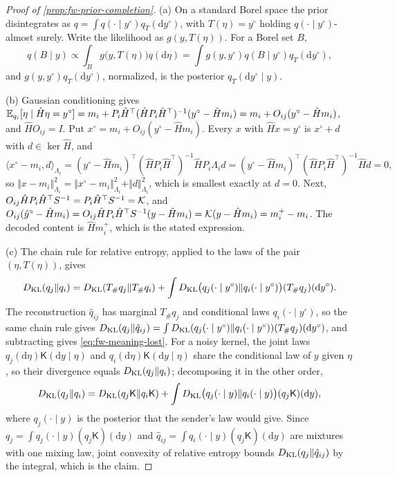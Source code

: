 \begin{proof}[Proof of \cref{prop:fw-prior-completion}]
(a) On a standard Borel space the prior disintegrates as $q=\int q(\cdot\mid y^\circ)q_T(\mathrm dy^\circ)$, with $T(\eta)=y^\circ$ holding $q(\cdot\mid y^\circ)$-almost surely. Write the likelihood as $g(y,T(\eta))$. For a Borel set $B$,
\[
q(B\mid y)\propto\int_Bg\bigl(y,T(\eta)\bigr)q(\mathrm d\eta)=\int g(y,y^\circ)q(B\mid y^\circ)q_T(\mathrm dy^\circ),
\]
and $g(y,y^\circ)q_T(\mathrm dy^\circ)$, normalized, is the posterior $q_T(\mathrm dy^\circ\mid y)$.

(b) Gaussian conditioning gives $\mathbb{E}_{q_i}[\eta\mid\hat H\eta=y^\circ]=m_i+P_i\hat H^\top(\hat HP_i\hat H^\top)^{-1}(y^\circ-\hat Hm_i)=m_i+O_{ij}(y^\circ-\hat Hm_i)$, and $\hat HO_{ij}=I$. Put $x^\circ=m_i+O_{ij}(y^\circ-\hat Hm_i)$. Every $x$ with $\hat Hx=y^\circ$ is $x^\circ+d$ with $d\in\ker\hat H$, and
\[
\langle x^\circ-m_i,d\rangle_{\Lambda_i}=(y^\circ-\hat Hm_i)^\top(\hat HP_i\hat H^\top)^{-1}\hat HP_i\Lambda_id=(y^\circ-\hat Hm_i)^\top(\hat HP_i\hat H^\top)^{-1}\hat Hd=0,
\]
so $\Vert x-m_i\Vert^2_{\Lambda_i}=\Vert x^\circ-m_i\Vert^2_{\Lambda_i}+\Vert d\Vert^2_{\Lambda_i}$, which is smallest exactly at $d=0$. Next, $O_{ij}\hat HP_i\hat H^\top S^{-1}=P_i\hat H^\top S^{-1}=\mathcal{K}$, and $O_{ij}(\hat y^\circ-\hat Hm_i)=O_{ij}\hat HP_i\hat H^\top S^{-1}(y-\hat Hm_i)=\mathcal{K}(y-\hat Hm_i)=m_i^+-m_i$. The decoded content is $\hat Hm_i^+$, which is the stated expression.

(c) The chain rule for relative entropy, applied to the laws of the pair $(\eta,T(\eta))$, gives
\[
D_{\mathrm{KL}}(q_j\Vert q_i)=D_{\mathrm{KL}}(T_\#q_j\Vert T_\#q_i)+\int D_{\mathrm{KL}}\bigl(q_j(\cdot\mid y^\circ)\Vert q_i(\cdot\mid y^\circ)\bigr)(T_\#q_j)(\mathrm dy^\circ).
\]
The reconstruction $\hat q_{ij}$ has marginal $T_\#q_j$ and conditional laws $q_i(\cdot\mid y^\circ)$, so the same chain rule gives $D_{\mathrm{KL}}(q_j\Vert\hat q_{ij})=\int D_{\mathrm{KL}}(q_j(\cdot\mid y^\circ)\Vert q_i(\cdot\mid y^\circ))(T_\#q_j)(\mathrm dy^\circ)$, and subtracting gives \eqref{eq:fw-meaning-lost}. For a noisy kernel, the joint laws $q_j(\mathrm d\eta)\mathsf K(\mathrm dy\mid\eta)$ and $q_i(\mathrm d\eta)\mathsf K(\mathrm dy\mid\eta)$ share the conditional law of $y$ given $\eta$, so their divergence equals $D_{\mathrm{KL}}(q_j\Vert q_i)$; decomposing it in the other order,
\[
D_{\mathrm{KL}}(q_j\Vert q_i)=D_{\mathrm{KL}}(q_j\mathsf K\Vert q_i\mathsf K)+\int D_{\mathrm{KL}}\bigl(q_j(\cdot\mid y)\Vert q_i(\cdot\mid y)\bigr)(q_j\mathsf K)(\mathrm dy),
\]
where $q_j(\cdot\mid y)$ is the posterior that the sender's law would give. Since $q_j=\int q_j(\cdot\mid y)(q_j\mathsf K)(\mathrm dy)$ and $\hat q_{ij}=\int q_i(\cdot\mid y)(q_j\mathsf K)(\mathrm dy)$ are mixtures with one mixing law, joint convexity of relative entropy bounds $D_{\mathrm{KL}}(q_j\Vert\hat q_{ij})$ by the integral, which is the claim.


\end{proof}
